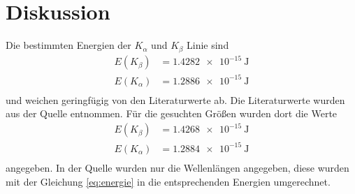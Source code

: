 \section{Diskussion}
\label{sec:Diskussion}

Die bestimmten Energien der $K_\alpha$ und $K_\beta$ Linie sind
\begin{align*}
  E(K_\beta) & = \SI{1.4282e-15}{\joule}\\
  E(K_\alpha) &= \SI{1.2886e-15}{\joule}\\
\end{align*}
und weichen geringfügig von den Literaturwerte ab.
Die Literaturwerte wurden aus der Quelle \cite[6]{roentgen} entnommen.
Für die gesuchten Größen wurden dort die Werte
\begin{align*}
    E(K_\beta) &= \SI{1.4268e-15}{\joule}\\
    E(K_\alpha) &= \SI{ 1.2884e-15}{\joule}\\
\end{align*}
angegeben.
In der Quelle wurden nur die Wellenlängen angegeben, diese wurden mit der Gleichung \eqref{eq:energie} in die entsprechenden Energien umgerechnet.

